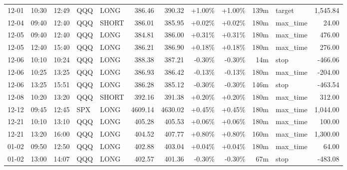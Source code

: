 \documentclass[11pt,a4paper,twoside]{article}
\begin{document}
\begin{center}
\begin{longtable}{>{\color{txtmain}}l l l l l r r r r r >{\color{txtmain}}l r}
12-01 & 10:30 & 12:49 & QQQ & LONG & 386.46 & 390.32 & \textcolor{wingreen}{+1.00\%} & \textcolor{wingreen}{+1.00\%} & 139m & target & \textcolor{wingreen}{1,545.84} \\
12-04 & 09:40 & 12:40 & QQQ & SHORT & 386.01 & 385.95 & \textcolor{wingreen}{+0.02\%} & \textcolor{wingreen}{+0.02\%} & 180m & max\_time & \textcolor{wingreen}{24.00} \\
12-05 & 09:40 & 12:40 & QQQ & LONG & 384.81 & 386.00 & \textcolor{wingreen}{+0.31\%} & \textcolor{wingreen}{+0.31\%} & 180m & max\_time & \textcolor{wingreen}{476.00} \\
12-05 & 12:40 & 15:40 & QQQ & LONG & 386.21 & 386.90 & \textcolor{wingreen}{+0.18\%} & \textcolor{wingreen}{+0.18\%} & 180m & max\_time & \textcolor{wingreen}{276.00} \\
12-06 & 10:10 & 10:24 & QQQ & LONG & 388.38 & 387.21 & \textcolor{lossred}{-0.30\%} & \textcolor{lossred}{-0.30\%} & 14m & stop & \textcolor{lossred}{-466.06} \\
12-06 & 10:25 & 13:25 & QQQ & LONG & 386.93 & 386.42 & \textcolor{lossred}{-0.13\%} & \textcolor{lossred}{-0.13\%} & 180m & max\_time & \textcolor{lossred}{-204.00} \\
12-06 & 13:25 & 15:51 & QQQ & LONG & 386.28 & 385.12 & \textcolor{lossred}{-0.30\%} & \textcolor{lossred}{-0.30\%} & 146m & stop & \textcolor{lossred}{-463.54} \\
12-08 & 10:20 & 13:20 & QQQ & SHORT & 392.16 & 391.38 & \textcolor{wingreen}{+0.20\%} & \textcolor{wingreen}{+0.20\%} & 180m & max\_time & \textcolor{wingreen}{312.00} \\
12-12 & 09:45 & 12:45 & SPX & LONG & 4609.14 & 4630.02 & \textcolor{wingreen}{+0.45\%} & \textcolor{wingreen}{+0.45\%} & 180m & max\_time & \textcolor{wingreen}{1,044.00} \\
12-21 & 10:10 & 13:10 & QQQ & LONG & 405.28 & 405.53 & \textcolor{wingreen}{+0.06\%} & \textcolor{wingreen}{+0.06\%} & 180m & max\_time & \textcolor{wingreen}{100.00} \\
12-21 & 13:20 & 16:00 & QQQ & LONG & 404.52 & 407.77 & \textcolor{wingreen}{+0.80\%} & \textcolor{wingreen}{+0.80\%} & 160m & max\_time & \textcolor{wingreen}{1,300.00} \\
01-02 & 09:50 & 12:50 & QQQ & LONG & 402.88 & 403.04 & \textcolor{wingreen}{+0.04\%} & \textcolor{wingreen}{+0.04\%} & 180m & max\_time & \textcolor{wingreen}{64.00} \\
01-02 & 13:00 & 14:07 & QQQ & LONG & 402.57 & 401.36 & \textcolor{lossred}{-0.30\%} & \textcolor{lossred}{-0.30\%} & 67m & stop & \textcolor{lossred}{-483.08} \\

\end{longtable}
\end{center}
\end{document}
